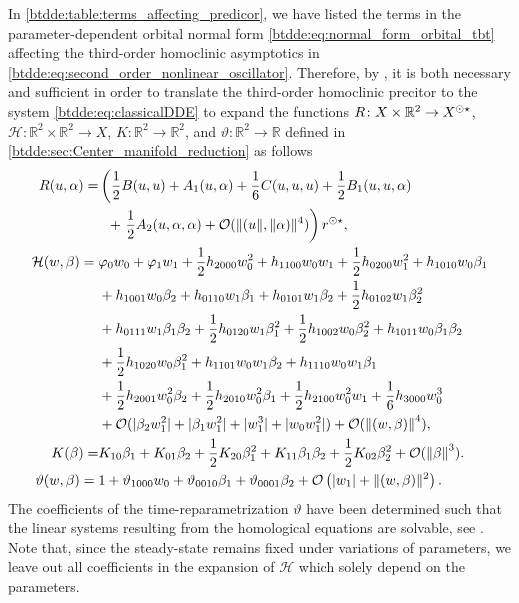 In \cref{btdde:table:terms_affecting_predicor}, we have listed the terms in the
parameter-dependent orbital normal form
\cref{btdde:eq:normal_form_orbital_tbt} affecting the third-order homoclinic
asymptotics in \cref{btdde:eq:second_order_nonlinear_oscillator}. Therefore, by
\cite[Theorem 1]{Bosschaert@Interplay}, it is both necessary and sufficient in
order to translate the third-order homoclinic precitor to the system
\cref{btdde:eq:classicalDDE} to expand the functions $R \colon X \times \mathbb R^2 \rightarrow X^{\odot\star}$, 
$\mathcal{H} \colon \mathbb R^2 \times \mathbb R^2 \rightarrow X$, $K \colon
\mathbb R^2 \rightarrow \mathbb R^2$, and $\vartheta \colon \mathbb R^2
\rightarrow \mathbb R$ defined in \cref{btdde:sec:Center_manifold_reduction} as
follows
%
\begin{align}
R(u,\alpha) =& \label{btdde:eq:R_expansion_TBT}
    \left(\frac{1}{2} B(u,u) + A_1(u,\alpha) + \frac{1}{6} C(u,u,u) + \frac{1}{2} B_1(u,u,\alpha) \right. \\
    &\phantom{\Bigl(}+ \left. \frac{1}{2} A_2(u,\alpha,\alpha) 
    + \mathcal O(\|(u\|,\|\alpha)\|^4) \right) r^{\odot\star} , \nonumber \\
        \mathcal H(w,\beta) = {}& \label{btdde:eq:h_expansion-TBT}
        \varphi_0 w_0 + \varphi_1 w_1 + \frac{1}{2}h_{2000}w_0^2 + h_{1100}w_0w_1 + \frac{1}{2}h_{0200}w_1^2 + h_{1010}w_0\beta_1 \\
    & +h_{1001}w_0\beta_2 + h_{0110}w_1\beta_1 + h_{0101}w_1\beta_2 + \frac{1}{2}h_{0102}w_1\beta_2^2 \nonumber \\
    & +h_{0111}w_1\beta_1\beta_2 + \frac{1}{2}h_{0120}w_1\beta_1^2 + \frac{1}{2}h_{1002}w_0\beta_2^2 + h_{1011}w_0\beta_1\beta_2 \nonumber \\
    & +\frac{1}{2}h_{1020}w_0\beta_1^2 + h_{1101}w_0w_1\beta_2 + h_{1110}w_0w_1\beta_1\nonumber \\
    & +\frac{1}{2}h_{2001}w_0^2\beta_2 + \frac{1}{2}h_{2010}w_0^2\beta_1 + \frac{1}{2}h_{2100}w_0^2w_1 + \frac{1}{6}h_{3000}w_0^3 \nonumber \\
    & +\mathcal{O}(|\beta_2w_1^2| + |\beta_1w_1^2| + |w_1^3| + |w_0w_1^2|) + \mathcal{O}(\left\Vert (w,\beta)\right\Vert ^4), \nonumber\\
K(\beta) =& K_{10}\beta_1 + K_{01}\beta_2 + 
            \frac{1}{2}K_{20}\beta_1^2 + K_{11}\beta_1\beta_2 + \frac{1}{2}K_{02}\beta_2^2
             +\mathcal{O}(\left\Vert \beta\right\Vert ^3).\label{btdde:eq:K_expansion_TBT} \\
\vartheta(w,\beta) = {}& \label{btdde:eq:theta_expansion_TBT}
        1 + \vartheta_{1000}w_0 + \vartheta_{0010} \beta_1 + \vartheta_{0001} \beta_2 
        + \mathcal O\left(|w_1| + \|(w,\beta)\|^2\right).
\end{align}
The coefficients of the time-reparametrization $\vartheta$ have been determined
such that the linear systems resulting from the homological equations are
solvable, see \cite[Remark 2.2]{Bosschaert@Interplay}. Note that, since the
steady-state remains fixed under variations of parameters, we leave
out all coefficients in the expansion of $\mathcal{H}$ which solely depend on
the parameters.

